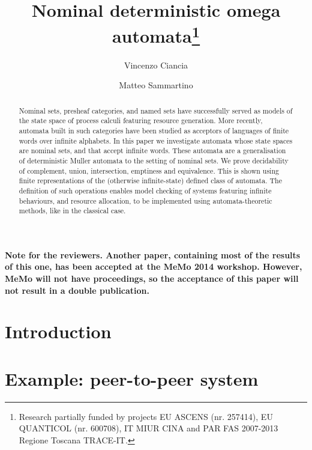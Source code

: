 \documentclass[orivec]{llncs}
\title{Nominal deterministic omega automata\thanks{Research partially funded by projects EU 
ASCENS (nr. 257414), EU QUANTICOL (nr. 600708), 
IT MIUR CINA and PAR FAS 2007-2013 Regione Toscana TRACE-IT.}
}
\author{Vincenzo Ciancia\inst{1} \and Matteo Sammartino\inst{2}}
\institute{ISTI-CNR, Pisa \and Dipartimento di Informatica, Universit\`a di Pisa, Pisa }
\begin{document}
%

\maketitle

\begin{abstract}
 Nominal sets, presheaf categories, and named sets have successfully served as models of the state space of process calculi featuring resource generation. More recently, automata built in such categories have been studied as acceptors of languages of finite words over infinite alphabets. In this paper we investigate automata whose state spaces are nominal sets, and that accept infinite words. These automata are a generalisation of deterministic Muller automata to the setting of nominal sets. 
 We prove decidability of complement, union, intersection, emptiness and equivalence. This is shown using finite representations of the (otherwise infinite-state) defined class of automata. The definition of such operations enables model checking of systems featuring infinite behaviours, and resource allocation, to be implemented using automata-theoretic methods, like in the classical case.
\end{abstract}

\paragraph{Note for the reviewers. Another paper, containing most of the results of this one, has been accepted at the MeMo 2014 workshop. However, MeMo will not have proceedings, so the acceptance of this paper will not result in a double publication.}

\section{Introduction}\label{sec:introduction}

\section{Example: peer-to-peer system}\label{sec:example}

\end{document}
